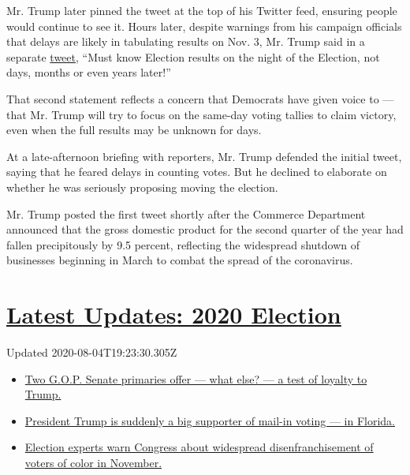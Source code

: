 Mr. Trump later pinned the tweet at the top of his Twitter feed,
ensuring people would continue to see it. Hours later, despite warnings
from his campaign officials that delays are likely in tabulating results
on Nov. 3, Mr. Trump said in a separate
\href{https://twitter.com/realDonaldTrump/status/1288933078287745024?s=20}{tweet},
``Must know Election results on the night of the Election, not days,
months or even years later!''

That second statement reflects a concern that Democrats have given voice
to --- that Mr. Trump will try to focus on the same-day voting tallies
to claim victory, even when the full results may be unknown for days.

At a late-afternoon briefing with reporters, Mr. Trump defended the
initial tweet, saying that he feared delays in counting votes. But he
declined to elaborate on whether he was seriously proposing moving the
election.

Mr. Trump posted the first tweet shortly after the Commerce Department
announced that the gross domestic product for the second quarter of the
year had fallen precipitously by 9.5 percent, reflecting the widespread
shutdown of businesses beginning in March to combat the spread of the
coronavirus.

\hypertarget{latest-updates-2020-election}{%
\section{\texorpdfstring{\href{https://www.nytimes3xbfgragh.onion/2020/08/04/us/elections/primary-election-michigan-arizona-kansas.html?action=click\&pgtype=Article\&state=default\&region=MAIN_CONTENT_1\&context=storylines_live_updates}{Latest
Updates: 2020
Election}}{Latest Updates: 2020 Election}}\label{latest-updates-2020-election}}

Updated 2020-08-04T19:23:30.305Z

\begin{itemize}
\tightlist
\item
  \href{https://www.nytimes3xbfgragh.onion/2020/08/04/us/elections/primary-election-michigan-arizona-kansas.html?action=click\&pgtype=Article\&state=default\&region=MAIN_CONTENT_1\&context=storylines_live_updates\#link-3924dd44}{Two
  G.O.P. Senate primaries offer --- what else? --- a test of loyalty to
  Trump.}
\item
  \href{https://www.nytimes3xbfgragh.onion/2020/08/04/us/elections/primary-election-michigan-arizona-kansas.html?action=click\&pgtype=Article\&state=default\&region=MAIN_CONTENT_1\&context=storylines_live_updates\#link-32b39e33}{President
  Trump is suddenly a big supporter of mail-in voting --- in Florida.}
\item
  \href{https://www.nytimes3xbfgragh.onion/2020/08/04/us/elections/primary-election-michigan-arizona-kansas.html?action=click\&pgtype=Article\&state=default\&region=MAIN_CONTENT_1\&context=storylines_live_updates\#link-6d019753}{Election
  experts warn Congress about widespread disenfranchisement of voters of
  color in November.}
\end{itemize}

